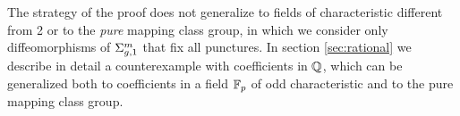

The strategy of the proof does not generalize to fields of characteristic different from 2 or to the \emph{pure}
mapping class group, in which we consider only diffeomorphisms of $\Sigma_{g,1}^m$ that fix all punctures. In section \ref{sec:rational}
we describe in detail a counterexample with coefficients in $\mathbb{Q}$, which can be generalized both to coefficients
in a field $\mathbb{F}_p$ of odd characteristic and to the pure mapping class group.

